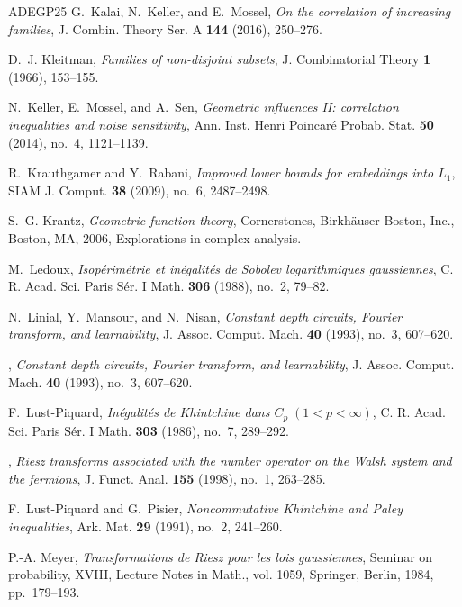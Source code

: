 \documentclass{amsbook}
\theoremstyle{definition}
\theoremstyle{remark}
\numberwithin{section}{chapter}
\numberwithin{equation}{chapter}
\newcommand{\1}{\mathbf{1}}
\begin{document}
\begin{thebibliography}{ADEGP25}
	G.~Kalai, N.~Keller, and E.~Mossel, \emph{On the correlation of increasing
		families}, J. Combin. Theory Ser. A \textbf{144} (2016), 250--276.
	
	D.~J. Kleitman, \emph{Families of non-disjoint subsets}, J. Combinatorial
	Theory \textbf{1} (1966), 153--155. 
	
	N.~Keller, E.~Mossel, and A.~Sen, \emph{Geometric influences {II}: correlation
		inequalities and noise sensitivity}, Ann. Inst. Henri Poincar\'{e} Probab.
	Stat. \textbf{50} (2014), no.~4, 1121--1139.
	
	R.~Krauthgamer and Y.~Rabani, \emph{Improved lower bounds for embeddings into
		{$L_1$}}, SIAM J. Comput. \textbf{38} (2009), no.~6, 2487--2498.
	
	S.~G. Krantz, \emph{Geometric function theory}, Cornerstones, Birkh\"{a}user
	Boston, Inc., Boston, MA, 2006, Explorations in complex analysis.
	
	M.~Ledoux, \emph{Isop\'{e}rim\'{e}trie et in\'{e}galit\'{e}s de {S}obolev
		logarithmiques gaussiennes}, C. R. Acad. Sci. Paris S\'{e}r. I Math.
	\textbf{306} (1988), no.~2, 79--82. 
	
	N.~Linial, Y.~Mansour, and N.~Nisan, \emph{Constant depth circuits, {F}ourier
		transform, and learnability}, J. Assoc. Comput. Mach. \textbf{40} (1993),
	no.~3, 607--620. 
	
	\bysame, \emph{Constant depth circuits, {F}ourier transform, and learnability},
	J. Assoc. Comput. Mach. \textbf{40} (1993), no.~3, 607--620. 
	
	F.~Lust-Piquard, \emph{In\'{e}galit\'{e}s de {K}hintchine dans
		{$C_p\;(1<p<\infty)$}}, C. R. Acad. Sci. Paris S\'{e}r. I Math. \textbf{303}
	(1986), no.~7, 289--292. 
	
	\bysame, \emph{Riesz transforms associated with the number operator on the
		{W}alsh system and the fermions}, J. Funct. Anal. \textbf{155} (1998), no.~1,
	263--285. 
	
	F.~Lust-Piquard and G.~Pisier, \emph{Noncommutative {K}hintchine and {P}aley
		inequalities}, Ark. Mat. \textbf{29} (1991), no.~2, 241--260. 
	
	P.-A. Meyer, \emph{Transformations de {R}iesz pour les lois gaussiennes},
	Seminar on probability, {XVIII}, Lecture Notes in Math., vol. 1059, Springer,
	Berlin, 1984, pp.~179--193. 
	

\end{thebibliography}
\end{document}
